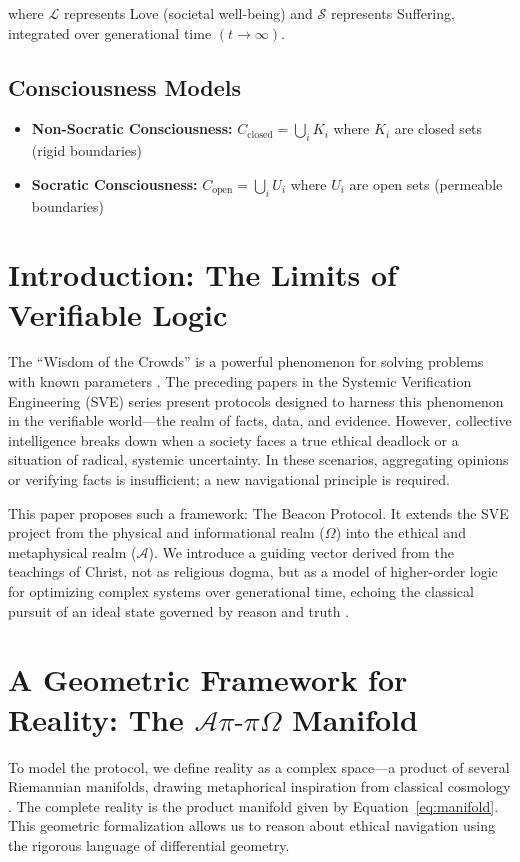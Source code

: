 \documentclass[11pt,a4paper]{article}
\begin{document}
where $\mathcal{L}$ represents Love (societal well-being) and $\mathcal{S}$ represents Suffering, integrated over generational time $(t \to \infty)$.

\subsection*{Consciousness Models}
\begin{itemize}
    \item \textbf{Non-Socratic Consciousness:} $C_{\text{closed}} = \bigcup_{i} K_i$ where $K_i$ are closed sets (rigid boundaries)
    \item \textbf{Socratic Consciousness:} $C_{\text{open}} = \bigcup_{i} U_i$ where $U_i$ are open sets (permeable boundaries)
\end{itemize}

\vspace{0.5cm}
\clearpage
\setcounter{page}{1}

\section{Introduction: The Limits of Verifiable Logic}
The ``Wisdom of the Crowds'' is a powerful phenomenon for solving problems with known parameters \citep{surowiecki2004wisdom}. The preceding papers in the Systemic Verification Engineering (SVE) series present protocols designed to harness this phenomenon in the verifiable world—the realm of facts, data, and evidence. However, collective intelligence breaks down when a society faces a true ethical deadlock or a situation of radical, systemic uncertainty. In these scenarios, aggregating opinions or verifying facts is insufficient; a new navigational principle is required.

This paper proposes such a framework: The Beacon Protocol. It extends the SVE project from the physical and informational realm ($\Omega$) into the ethical and metaphysical realm ($\mathcal{A}$). We introduce a guiding vector derived from the teachings of Christ, not as religious dogma, but as a model of higher-order logic for optimizing complex systems over generational time, echoing the classical pursuit of an ideal state governed by reason and truth \citep{plato_republic}.

\section{A Geometric Framework for Reality: The \texorpdfstring{$\mathcal{A}\pi\text{-}\pi\Omega$}{Api-piOmega} Manifold}
To model the protocol, we define reality as a complex space—a product of several Riemannian manifolds, drawing metaphorical inspiration from classical cosmology \citep{old_testament}. The complete reality is the product manifold given by Equation~\eqref{eq:manifold}. This geometric formalization allows us to reason about ethical navigation using the rigorous language of differential geometry.
\end{document}
